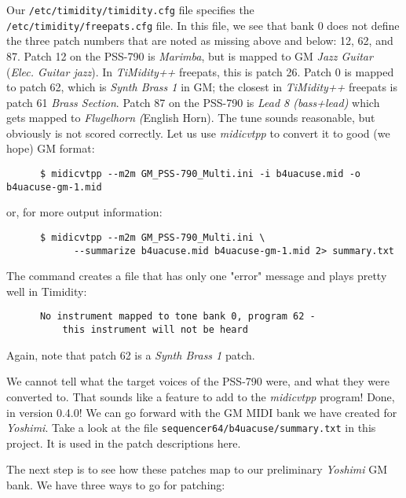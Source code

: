    Our \texttt{/etc/timidity/timidity.cfg}
   file specifies the \texttt{/etc/timidity/freepats.cfg} file.
   In this file, we see that bank 0 does not define the three patch numbers
   that are noted as missing above and below:  12, 62, and 87.  Patch 12 on the
   PSS-790 is
   \textsl{Marimba}, but is mapped to GM
   \textsl{Jazz Guitar} 
   (\textsl{Elec. Guitar jazz}).
   In \textsl{TiMidity++} freepats, this is patch 26.
   Patch 0 is mapped to
   patch 62, which is
   \textsl{Synth Brass 1} in GM;
   the closest in \textsl{TiMidity++} freepats is
   patch 61
   \textsl{Brass Section}.  Patch 87 on the PSS-790 is
   \textsl{Lead 8 (bass+lead)}
   which gets mapped to
   \textsl{Flugelhorn} 
   \textsl({English Horn}).
   The tune sounds reasonable, but obviously is not scored correctly.
   Let us use \textsl{midicvtpp} \cite{midicvt}
   to convert it to good (we hope) GM format:

   \begin{verbatim}
      $ midicvtpp --m2m GM_PSS-790_Multi.ini -i b4uacuse.mid -o b4uacuse-gm-1.mid
   \end{verbatim}

   or, for more output information:

   \begin{verbatim}
      $ midicvtpp --m2m GM_PSS-790_Multi.ini \
            --summarize b4uacuse.mid b4uacuse-gm-1.mid 2> summary.txt
   \end{verbatim}

   The command creates a file that has only one "error" message and
   plays pretty well in Timidity:

   \begin{verbatim}
      No instrument mapped to tone bank 0, program 62 -
          this instrument will not be heard
   \end{verbatim}

   Again, note that patch 62 is a \textsl{Synth Brass 1} patch.

   We cannot tell what the target voices of the PSS-790 were, and what they
   were converted to.  That sounds like a feature to add to the
   \textsl{midicvtpp} program!
   Done, in version 0.4.0!
   We can go forward with the GM MIDI bank we have created
   for \textsl{Yoshimi}.
   Take a look at the file \texttt{sequencer64/b4uacuse/summary.txt}
   in this project.  It is used in the patch descriptions here.

   The next step is to see how these patches map to our preliminary
   \textsl{Yoshimi} GM
   bank.  We have three ways to go for patching:

